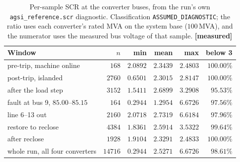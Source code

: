 \documentclass[12pt,a4paper]{article}
\theoremstyle{remark}
\newcommand{\code}[1]{\texttt{\small #1}}
\newcommand{\measured}{\textcolor{ok}{\textbf{[measured]}}}
\begin{document}
\begin{table}[H]
\centering
\small
\begin{tabular}{@{}lrrrrr@{}}
\toprule
\textbf{Window} & $n$ & \textbf{min} & \textbf{mean} & \textbf{max} & \textbf{below 3}\\
\midrule
pre-trip, machine online & $168$ & $2.0892$ & $2.3439$ & $2.4803$ & $100.00\%$\\
post-trip, islanded      & $2760$ & $0.6501$ & $2.3015$ & $2.8147$ & $100.00\%$\\
after the load step      & $3152$ & $1.5411$ & $2.6899$ & $3.2908$ & $95.53\%$\\
fault at bus 9, $85.00$--$85.15$ & $164$ & $0.2944$ & $1.2954$ & $6.6726$ & $97.56\%$\\
line 6--13 out           & $2160$ & $2.0718$ & $2.7319$ & $6.6184$ & $97.96\%$\\
restore to reclose       & $4384$ & $1.8361$ & $2.5914$ & $3.5322$ & $99.64\%$\\
after reclose            & $1928$ & $1.9104$ & $2.3291$ & $2.4833$ & $100.00\%$\\
\midrule
whole run, all four converters & $14716$ & $0.2944$ & $2.5271$ & $6.6726$ & $\mathbf{98.61\%}$\\
\bottomrule
\end{tabular}
\caption{Per-sample SCR at the converter buses, from the run's own
\code{agsi\_reference.scr} diagnostic. Classification
\code{ASSUMED\_DIAGNOSTIC}; the ratio uses each converter's rated MVA on the
system base ($100$\,MVA), and the numerator uses the measured bus voltage of
that sample. \measured}
\label{tab:scr}
\end{table}
\end{document}
